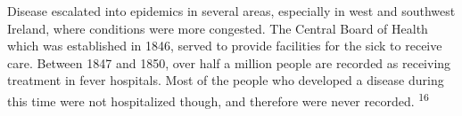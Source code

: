\begin{Spacing}{1.5}
Disease escalated into epidemics in several areas, especially in west and southwest Ireland, where conditions were more congested. The Central Board of Health which was established in 1846, served to provide facilities for the sick to receive care. Between 1847 and 1850, over half a million people are recorded as receiving treatment in fever hospitals. Most of the people who developed a disease during this time were not hospitalized though, and therefore were never recorded. \textsuperscript{16} 




\end{Spacing}
